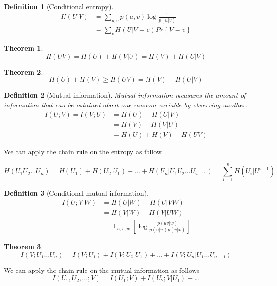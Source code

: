 \documentclass[twoside]{article}
\newtheorem{theorem}{Theorem}[section]
\newtheorem{definition}{Definition}[section]
\theoremstyle{definition} %
\renewcommand{\Pr}[1]{Pr\left\{#1\right\}}
\DeclareMathOperator{\E}{\mathbb{E}}%
\begin{document}
\begin{definition}[Conditional entropy]
  \begin{align*}
    H(U|V) &= \sum_{u,v} p(u,v) \log \frac 1 {p(u|v)}\\
           &= \sum_v H(U | V = v) \Pr{V = v}
  \end{align*}
\end{definition}

\begin{theorem}
  \[
    H(UV) = H(U) + H(V|U) = H(V) + H(U|V)
  \]
\end{theorem}

\begin{theorem}
  \[
    H(U) + H(V) \geq H(UV) = H(V) + H(U|V)
  \]
\end{theorem}

\begin{definition}[Mutual information]
  Mutual information measures the amount of information that can be obtained about one random variable by observing another.
  \begin{align*}
  I(U;V) = I(V;U) &= H(U) - H(U|V)\\
  &= H(V) - H(V|U)\\
  &= H(U) + H(V) - H(UV)
  \end{align*}
\end{definition}

We can apply the chain rule on the entropy as follow

\[
  H(U_1 U_2 \dots U_n) = H(U_1) + H(U_2|U_1) + \dots + H(U_n|U_1 U_2 \dots U_{n-1})
  = \sum_{i = 1}^n H(U_i | U^{i-1})
\]

\begin{definition}[Conditional mutual information]
  \begin{align*}
    I(U;V|W) &= H(U|W) - H(U|VW)\\
    &= H(V|W) - H(V|UW)\\
    &= \E_{u,v,w} \left[ \log \frac {p(uv|w)} {p(u|w)p(v|w)} \right]
  \end{align*}
\end{definition}

\begin{theorem}
  \[
    I(V;U_1\dots U_n) = I(V;U_1) + I(V;U_2 | U_1) + \dots + I(V;U_n|U_1 \dots U_{n-1})
  \]
\end{theorem}

We can apply the chain rule on the mutual information as follows
\[
  I(U_1, U_2, ... ; V) = I(U_1; V) + I(U_2; V | U_1) + ...
\]
\end{document}
